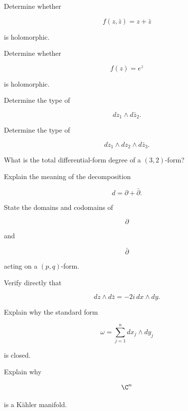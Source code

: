 \begin{exercise}[2]
Determine whether

\[
f(z,\bar z)=z+\bar z
\]

is holomorphic.
\end{exercise}

\begin{exercise}[2]
Determine whether

\[
f(z)=e^z
\]

is holomorphic.
\end{exercise}

\begin{exercise}[2]
Determine the type of

\[
dz_1\wedge d\bar z_2.
\]
\end{exercise}

\begin{exercise}[2]
Determine the type of

\[
dz_1\wedge dz_2\wedge d\bar z_3.
\]
\end{exercise}

\begin{exercise}[2]
What is the total differential-form degree of a \((3,2)\)-form?
\end{exercise}

\begin{exercise}[2]
Explain the meaning of the decomposition

\[
d=\partial+\bar{\partial}.
\]
\end{exercise}

\begin{exercise}[2]
State the domains and codomains of

\[
\partial
\]

and

\[
\bar{\partial}
\]

acting on a \((p,q)\)-form.
\end{exercise}

\begin{exercise}[2]
Verify directly that

\[
dz\wedge d\bar z=-2i\,dx\wedge dy.
\]
\end{exercise}

\begin{exercise}[2]
Explain why the standard form

\[
\omega
=
\sum_{j=1}^{n}
dx_j\wedge dy_j
\]

is closed.
\end{exercise}

\begin{exercise}[2]
Explain why

\[
\C^n
\]

is a K\"ahler manifold.
\end{exercise}

